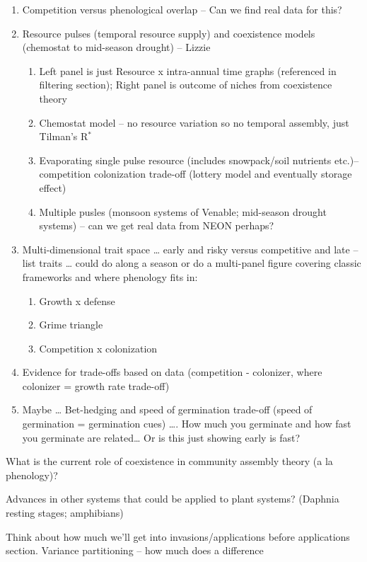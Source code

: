 \documentclass[11pt,letter]{article}
\begin{document}
\begin{enumerate}
\item Competition versus phenological overlap -- Can we find real data for this?
\item Resource pulses (temporal resource supply) and coexistence models (chemostat to mid-season drought)  -- Lizzie
\begin{enumerate}
\item Left panel is just Resource x intra-annual time graphs (referenced in filtering section); Right panel is outcome of niches from coexistence theory 
\item Chemostat model – no resource variation so no temporal assembly, just Tilman's R$^*$
\item Evaporating single pulse resource (includes snowpack/soil nutrients etc.)– competition colonization trade-off (lottery model and eventually storage effect) 
\item Multiple pusles (monsoon systems of Venable; mid-season drought systems) -- can we get real data from NEON perhaps?
\end{enumerate}
\item Multi-dimensional trait space … early and risky versus competitive and late – list traits … could do along a season or do a multi-panel figure covering classic frameworks and where phenology fits in:
\begin{enumerate}
\item Growth x defense
\item Grime triangle
\item Competition x colonization
\end{enumerate}
\item Evidence for trade-offs based on data (competition - colonizer, where colonizer = growth rate trade-off)
\item Maybe … Bet-hedging and speed of germination trade-off (speed of germination = germination cues) …. How much you germinate and how fast you germinate are related… Or is this just showing early is fast?
\end{enumerate}


What is the current role of coexistence in community assembly theory (a la phenology)?

Advances in other systems that could be applied to plant systems? (Daphnia resting stages; amphibians) 

Think about how much we'll get into invasions/applications before applications section. 
Variance partitioning -- how much does a difference 
\end{document}
